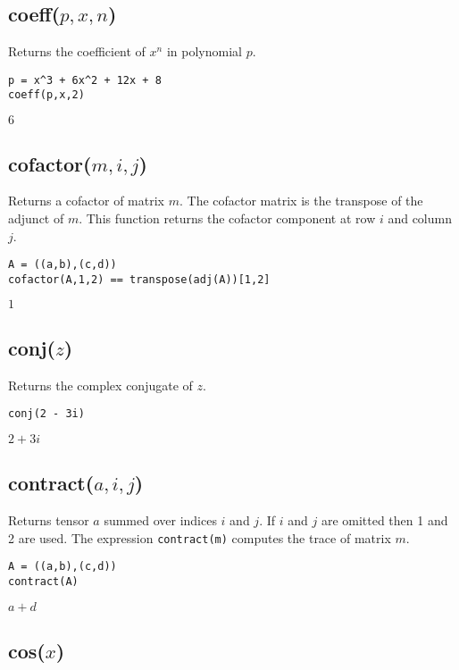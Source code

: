 \subsection*{coeff($p,x,n$)}

Returns the coefficient of $x^n$ in polynomial $p$.

{\color{blue}
\begin{verbatim}
p = x^3 + 6x^2 + 12x + 8
coeff(p,x,2)
\end{verbatim}
}

\noindent
$6$

\subsection*{cofactor($m,i,j$)}

Returns a cofactor of matrix $m$.
The cofactor matrix is the transpose of the adjunct of $m$.
This function returns the cofactor component at row $i$ and column $j$.

{\color{blue}
\begin{verbatim}
A = ((a,b),(c,d))
cofactor(A,1,2) == transpose(adj(A))[1,2]
\end{verbatim}
}

\noindent
$1$

\subsection*{conj($z$)}

Returns the complex conjugate of $z$.

{\color{blue}
\begin{verbatim}
conj(2 - 3i)
\end{verbatim}
}

\noindent
$2 + 3 i$

\subsection*{contract($a,i,j$)}

Returns tensor $a$ summed over indices $i$ and $j$.
If $i$ and $j$ are omitted then 1 and 2 are used.
The expression {\tt contract(m)} computes the trace of matrix $m$.

{\color{blue}
\begin{verbatim}
A = ((a,b),(c,d))
contract(A)
\end{verbatim}
}

\noindent
$a + d$

\subsection*{cos($x$)}

